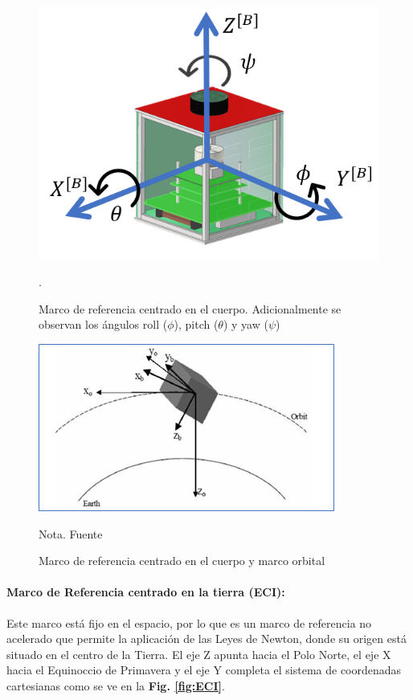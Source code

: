 \begin{figure}[!ht]
	\begin{center}
		\includegraphics[scale=0.7]{imagenes/marco_teorico/marco_cuerpo.PNG}\\
	\end{center}
	\caption{ Marco de referencia centrado en el cuerpo. Adicionalmente se observan los ángulos roll ($\phi$), pitch ($\theta$) y yaw ($\psi$)}.
	\label{fig:marco_cuerpo}
\end{figure}

\begin{figure}[!ht]
	\begin{center}
		\includegraphics[scale=0.9]{imagenes/marco_teorico/orbital_cuerpo.PNG}\\
	\end{center}
	\caption{ Marco de referencia centrado en el cuerpo y marco orbital}
	\label{fig:marco_orbital_cuerpo}
		\footnotesize{Nota. Fuente \cite{Karatas2006}}
\end{figure}

\paragraph{Marco de Referencia centrado en la tierra (ECI):}Este marco está fijo en el espacio, por lo que es un marco de referencia no acelerado que permite la aplicación de las Leyes de Newton, donde su origen está situado en el centro de la Tierra. El eje Z apunta hacia el Polo Norte, el eje X hacia el Equinoccio de Primavera y el eje Y completa el sistema de coordenadas cartesianas como se ve en la \textbf{Fig. \ref{fig:ECI}}.
 
